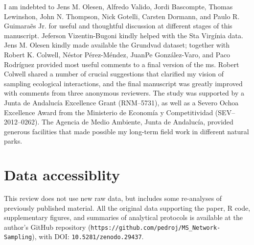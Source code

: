 \documentclass[12pt]{article}
\begin{document}
I am indebted to Jens M. Olesen, Alfredo Valido, Jordi Bascompte, Thomas Lewinshon, John N. Thompson, Nick Gotelli, Carsten Dormann, and Paulo R. Guimara\~es Jr. for useful and thoughtful discussion at different stages of this manuscript. Jeferson Vizentin-Bugoni kindly helped with the Sta Virg\'inia data. Jens M. Olesen kindly made available the Grundvad dataset; together with Robert K. Colwell, N\'estor P\'erez-M\'endez, JuanPe Gonz\'alez-Varo, and Paco Rodr\'iguez provided most useful comments to a final version of the ms. Robert Colwell shared a number of crucial suggestions that clarified my vision of sampling ecological interactions, and the final manuscript was greatly improved with comments from three anonymous reviewers. The study was supported by a Junta de Andaluc\'ia Excellence Grant (RNM--5731), as well as a Severo Ochoa Excellence Award from the Ministerio de Econom\'ia y Competitividad (SEV--2012--0262). The Agencia de Medio Ambiente, Junta de Andaluc\'ia, provided generous facilities that made possible my long-term field work in different natural parks.
\section*{Data accessiblity}
This review does not use new raw data, but includes some re-analyses of previously published material. All the original data supporting the paper, R code, supplementary figures, and summaries of analytical protocols is available at the author's GitHub repository (\texttt{https://github.com/pedroj/MS\_Network-Sampling}), with DOI: \texttt{10.5281/zenodo.29437}.
\newpage
\end{document}
